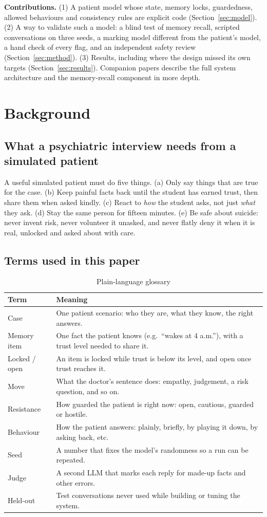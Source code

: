 \documentclass[journal]{IEEEtran}
\begin{document}
\textbf{Contributions.} (1) A patient model whose state, memory locks, guardedness, allowed behaviours and consistency rules are explicit code
(Section~\ref{sec:model}). (2) A way to validate such a model: a blind test of memory recall, scripted conversations on three seeds, a
marking model different from the patient's model, a hand check of every flag, and an independent safety review
(Section~\ref{sec:method}). (3) Results, including where the design missed its own targets (Section~\ref{sec:results}). Companion papers
describe the full system architecture and the memory-recall component in more depth.

\section{Background}
\subsection{What a psychiatric interview needs from a simulated patient}
A useful simulated patient must do five things. (a) Only say things that are true for the case. (b) Keep painful facts back until the student has earned trust, then share them when asked kindly. (c) React to \emph{how} the student asks, not just \emph{what} they ask. (d) Stay the same person for fifteen minutes. (e) Be safe about suicide: never invent risk, never volunteer it unasked, and never flatly deny it when it is real, unlocked and asked about with care.

\subsection{Terms used in this paper}
\begin{table}[h]
\caption{Plain-language glossary}
\label{tab:glossary}
\centering
\footnotesize
\begin{tabularx}{\columnwidth}{@{}lY@{}}
\toprule
Term & Meaning\\
\midrule
Case & One patient scenario: who they are, what they know, the right answers.\\
Memory item & One fact the patient knows (e.g.\ ``wakes at 4 a.m.''), with a trust level needed to share it.\\
Locked / open & An item is locked while trust is below its level, and open once trust reaches it.\\
Move & What the doctor's sentence does: empathy, judgement, a risk question, and so on.\\
Resistance & How guarded the patient is right now: open, cautious, guarded or hostile.\\
Behaviour & How the patient answers: plainly, briefly, by playing it down, by asking back, etc.\\
Seed & A number that fixes the model's randomness so a run can be repeated.\\
Judge & A second LLM that marks each reply for made-up facts and other errors.\\
Held-out & Test conversations never used while building or tuning the system.\\
\bottomrule
\end{tabularx}
\end{table}
\end{document}
